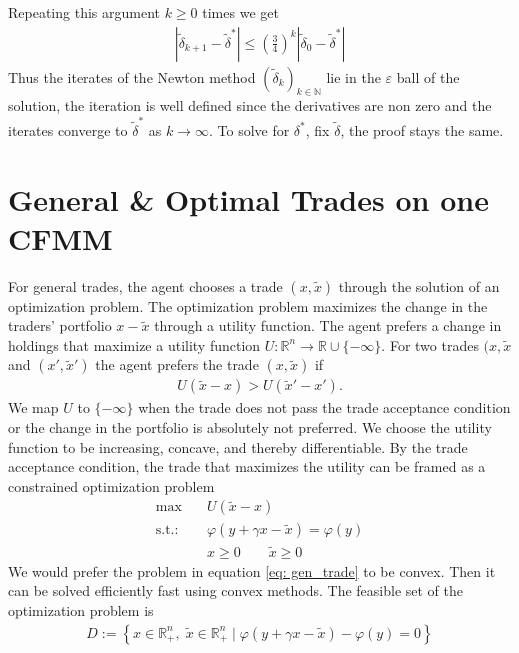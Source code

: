 Repeating this argument $k\ge0$ times we get
\begin{align}
    |\tilde{\delta}_{k+1}-\tilde{\delta}^{*} | \le \left( \frac{3}{4} \right)^{k}
    |\tilde{\delta}_0-\tilde{\delta}^{*}|
\end{align}
Thus the iterates of the Newton method $(\tilde{\delta}_k)_{k\in\mathbb{N}}$
lie in the $\varepsilon$ ball of the solution, the iteration is well defined
since the derivatives are non zero and the iterates converge to
$\tilde{\delta}^{*}$ as $k\to\infty$. To solve for $\delta^{*} $, fix
$\tilde{\delta}$, the proof stays the same.

\section{General \& Optimal Trades on one CFMM}
For general trades, the agent chooses a trade $(x, \tilde{x})$ through the
solution of an optimization problem. The optimization problem maximizes the
change in the traders' portfolio $x -\tilde{x}$ through a utility function.
The agent prefers a change in holdings that maximize a utility function $U:
\mathbb{R}^{n}  \to \mathbb{R} \cup \{-\infty\} $. For two trades $(x,
\tilde{x}$ and $(x',
\tilde{x}')$ the agent prefers the trade $(x, \tilde{x})$ if
\begin{align}
    U(\tilde{x} -x) > U(\tilde{x}' - x').
\end{align}
We map $U$ to  $\{-\infty\}$ when the trade does not pass the trade
acceptance condition or the change in the portfolio is absolutely not
preferred. We choose the utility function to be increasing, concave, and
thereby differentiable. By the trade acceptance condition, the trade that
maximizes the utility can be framed as a constrained optimization problem
\begin{align}
    \text{max} \quad &U(\tilde{x} - x) \label{eq: gen_trade}\\
    \text{s.t.:}\quad & \varphi(y + \gamma x - \tilde{x}) =
    \varphi(y)\nonumber \\
      &x\ge 0 \qquad \tilde{x} \ge 0\nonumber
\end{align}
We would prefer the problem in equation \ref{eq: gen_trade} to be convex.
Then it can be solved efficiently fast using convex methods. The feasible set
of the optimization problem is
\begin{align}
    D := \left\{ x \in \mathbb{R}^{n}_+,\; \tilde{x} \in \mathbb{R}^{n}_+\;
    |\;
    \varphi(y + \gamma x - \tilde{x}) - \varphi(y) =0
\right\}
\end{align}
